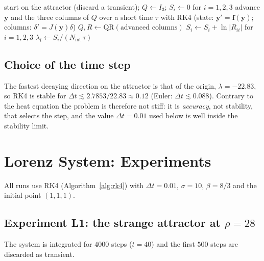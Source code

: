 \documentclass[11pt,a4paper]{article}
\newcommand{\Dt}{\Delta t}
\newcommand{\bfy}{\mathbf{y}}
\newcommand{\bff}{\mathbf{f}}
\begin{document}
\begin{algorithm}[H]
\caption{Lyapunov exponents of the Lorenz system (Benettin's method)}\label{alg:lyap}
\begin{algorithmic}[1]
\State start on the attractor (discard a transient); $Q\gets I_3$; $S_i\gets0$ for $i=1,2,3$
  \State advance $\bfy$ and the three columns of $Q$ over a short time $\tau$ with RK4
  \State \qquad (state: $\bfy'=\bff(\bfy)$; columns: $\delta'=J(\bfy)\delta$)
  \State $Q,R\gets \mathrm{QR}(\text{advanced columns})$
  \State $S_i\gets S_i+\ln|R_{ii}|$ for $i=1,2,3$
\EndFor
\State \Return $\lambda_i\gets S_i/(N_{\mathrm{int}}\,\tau)$
\end{algorithmic}
\end{algorithm}

\subsection{Choice of the time step}

The fastest decaying direction on the attractor is that of the origin, $\lambda=-22.83$, so RK4 is stable
for $\Dt\lesssim2.7853/22.83\approx0.12$ (Euler: $\Dt\lesssim0.088$). Contrary to the heat equation the
problem is therefore not stiff: it is \emph{accuracy}, not stability, that selects the step, and the
value $\Dt=0.01$ used below is well inside the stability limit.

\section{Lorenz System: Experiments}\label{sec:lorenzexp}

All runs use RK4 (Algorithm~\ref{alg:rk4}) with $\Dt=0.01$, $\sigma=10$, $\beta=8/3$ and the initial
point $(1,1,1)$.

\subsection{Experiment L1: the strange attractor at $\rho=28$}

The system is integrated for $4000$ steps ($t=40$) and the first $500$ steps are discarded as transient.
\end{document}
